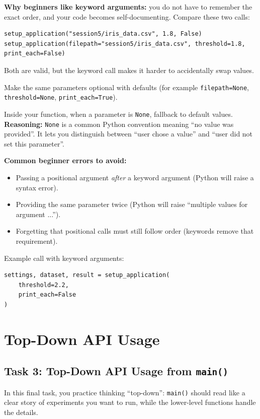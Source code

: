 \noindent
\textbf{Why beginners like keyword arguments:} you do not have to remember the exact order, and your code becomes self-documenting.
Compare these two calls:
\begin{verbatim}
setup_application("session5/iris_data.csv", 1.8, False)
setup_application(filepath="session5/iris_data.csv", threshold=1.8, print_each=False)
\end{verbatim}
Both are valid, but the keyword call makes it harder to accidentally swap values.

\noindent
Make the same parameters optional with defaults (for example \texttt{filepath=None}, \texttt{threshold=None}, \texttt{print\_each=True}).

Inside your function, when a parameter is \texttt{None}, fallback to default values.
\noindent
\textbf{Reasoning:} \texttt{None} is a common Python convention meaning ``no value was provided''.
It lets you distinguish between ``user chose a value'' and ``user did not set this parameter''.

\noindent
\textbf{Common beginner errors to avoid:}
\begin{itemize}\setlength{\itemsep}{2pt}
    \item Passing a positional argument \textit{after} a keyword argument (Python will raise a syntax error).
    \item Providing the same parameter twice (Python will raise ``multiple values for argument ...'').
    \item Forgetting that positional calls must still follow order (keywords remove that requirement).
\end{itemize}

Example call with keyword arguments:
\begin{verbatim}
settings, dataset, result = setup_application(
    threshold=2.2,
    print_each=False
)
\end{verbatim}

\section{Top-Down API Usage}

\subsection{Task 3: Top-Down API Usage from \texttt{main()}}
In this final task, you practice thinking ``top-down'':
\texttt{main()} should read like a clear story of experiments you want to run, while the lower-level functions handle the details.

